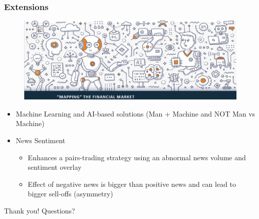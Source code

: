 \documentclass[pdf,9pt,xcolor=dvipsnames,hide notes]{beamer}
\begin{document}
\begin{frame}
\frametitle{Extensions}

	\begin{figure}[htbp]
	\centering
\includegraphics[scale=0.35]{man_machine2.png}
	\label{fig:fig3}
\end{figure}

\begin{itemize}
		\item Machine Learning and AI-based solutions (Man + Machine and NOT Man vs Machine) 
\vspace{0.3cm}
	\item News Sentiment
	\begin{itemize}
		\item Enhances a pairs-trading strategy using an abnormal news volume and sentiment overlay
		\item Effect of negative news is bigger than positive news and can lead to bigger sell-offs (asymmetry)
	\end{itemize}
	

	
\end{itemize}

\end{frame}

\begin{frame}

	\centering
	\Large{Thank you! Questions?}
	
\end{frame}
\end{document}
